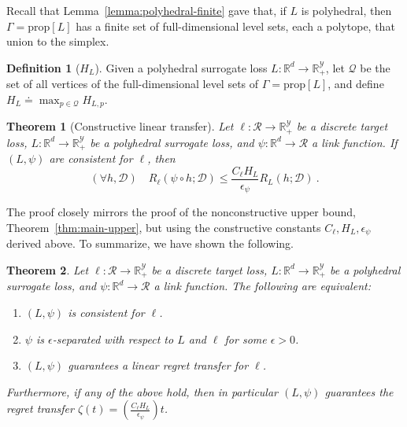 \documentclass{article}
\newtheorem{theorem}{Theorem}
\newtheorem{lemma}{Lemma}
\theoremstyle{definition}\newtheorem{definition}{Definition}
\theoremstyle{definition}\newtheorem{assumption}{Assumption}
\newcommand{\reals}{\mathbb{R}}
\newcommand{\defeq}{\doteq}%
\newcommand{\prop}[1]{\mathrm{prop}[#1]}
\newcommand{\D}{\mathcal{D}}
\newcommand{\R}{\mathcal{R}}
\newcommand{\Y}{\mathcal{Y}}
\begin{document}
Recall that Lemma~\ref{lemma:polyhedral-finite} gave that, if $L$ is polyhedral, then $\Gamma = \prop{L}$ has a finite set of full-dimensional level sets, each a polytope, that union to the simplex.
\begin{definition}[$H_L$]
  Given a polyhedral surrogate loss $L: \reals^d \to \reals_+^{\Y}$, let $\mathcal{Q}$ be the set of all vertices of the full-dimensional level sets of $\Gamma = \prop{L}$, and define $H_L \defeq \max_{p \in \mathcal{Q}} H_{L,p}$.
\end{definition}



\begin{theorem}[Constructive linear transfer] \label{thm:separated-constant}
  Let $\ell: \R \to \reals_+^{\Y}$ be a discrete target loss, $L: \reals^d \to \reals_+^{\Y}$ be a polyhedral surrogate loss, and $\psi: \reals^d \to \R$ a link function.
  If $(L,\psi)$ are consistent for $\ell$, then
    \[ (\forall h,\D) \quad R_{\ell}(\psi \circ h ; \D) \leq \frac{C_{\ell} H_L}{\epsilon_{\psi}} R_L(h ; \D) ~. \]
\end{theorem}
The proof closely mirrors the proof of the nonconstructive upper bound, Theorem~\ref{thm:main-upper}, but using the constructive constants $C_{\ell}, H_L, \epsilon_{\psi}$ derived above.
To summarize, we have shown the following.
\begin{theorem} \label{thm:tfae}
  Let $\ell: \R \to \reals_+^{\Y}$ be a discrete target loss, $L: \reals^d \to \reals_+^{\Y}$ be a polyhedral surrogate loss, and $\psi: \reals^d \to \R$ a link function.
  The following are equivalent:
  \begin{enumerate}
    \item $(L,\psi)$ is consistent for $\ell$.
    \item $\psi$ is $\epsilon$-separated with respect to $L$ and $\ell$ for some $\epsilon > 0$.
    \item $(L,\psi)$ guarantees a linear regret transfer for $\ell$.
  \end{enumerate}
  Furthermore, if any of the above hold, then in particular $(L,\psi)$ guarantees the regret transfer $\zeta(t) = \left(\frac{C_{\ell} H_L}{\epsilon_{\psi}}\right) t$.
\end{theorem}
\end{document}
